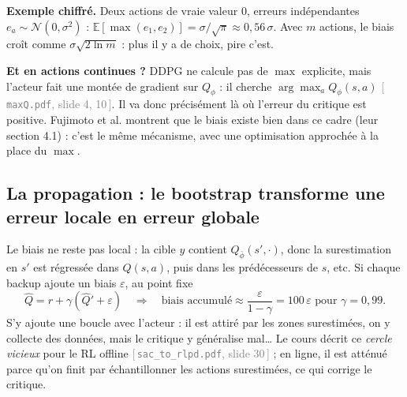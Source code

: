 \documentclass[11pt,a4paper]{article}
\newcommand{\E}{\mathbb{E}}
\newcommand{\code}[1]{\texttt{#1}}
\newcommand{\slide}[2]{\textcolor{gray}{[\,\code{#1}, slide #2\,]}}
\begin{document}
\textbf{Exemple chiffré.} Deux actions de vraie valeur $0$, erreurs indépendantes
$e_a\sim\mathcal N(0,\sigma^2)$ : $\E[\max(e_1,e_2)] = \sigma/\sqrt\pi \approx 0{,}56\,\sigma$.
Avec $m$ actions, le biais croît comme $\sigma\sqrt{2\ln m}$ : plus il y a de choix, pire c'est.

\textbf{Et en actions continues ?} DDPG ne calcule pas de $\max$ explicite, mais l'acteur fait une
montée de gradient sur $Q_\phi$ : il cherche $\arg\max_a Q_\phi(s,a)$ \slide{maxQ.pdf}{4, 10}. Il va
donc précisément là où l'erreur du critique est positive. Fujimoto et al. montrent que le biais
existe bien dans ce cadre (leur section 4.1) : c'est le même mécanisme, avec une optimisation
approchée à la place du $\max$.

\subsection{La propagation : le bootstrap transforme une erreur locale en erreur globale}
Le biais ne reste pas local : la cible $y$ contient $Q_{\bar\phi}(s',\cdot)$, donc la surestimation
en $s'$ est régressée dans $Q(s,a)$, puis dans les prédécesseurs de $s$, etc. Si chaque backup ajoute
un biais $\varepsilon$, au point fixe
\begin{equation}
  \hat Q = r + \gamma(\hat Q' + \varepsilon) \quad\Longrightarrow\quad
  \text{biais accumulé} \approx \frac{\varepsilon}{1-\gamma} = 100\,\varepsilon \text{ pour } \gamma=0{,}99.
\end{equation}
S'y ajoute une boucle avec l'acteur : il est attiré par les zones surestimées, on y collecte des
données, mais le critique y généralise mal… Le cours décrit ce \emph{cercle vicieux} pour le RL
offline \slide{sac\_to\_rlpd.pdf}{30} ; en ligne, il est atténué parce qu'on finit par échantillonner
les actions surestimées, ce qui corrige le critique.

\begin{center}
\end{center}
\end{document}
